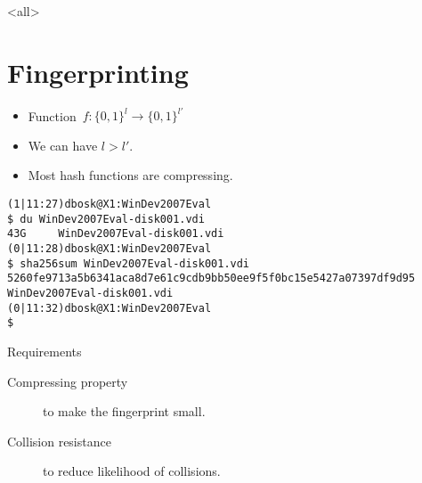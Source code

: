 \mode*

\mode<all>{}


\section{Fingerprinting}

\begin{frame}
  \begin{definition}[Compressing]
    \begin{itemize}
      \item Function~\(f\colon \{0, 1\}^{l}\to \{0, 1\}^{l'}\)
      \item We can have \(l > l'\).
    \end{itemize}
  \end{definition}

  \pause

  \begin{remark}
    \begin{itemize}
      \item Most hash functions are compressing.
    \end{itemize}
  \end{remark}
\end{frame}

\begin{frame}[fragile]
  \begin{example}[Compressing]
    \begin{itemize}
      \begin{verbatim}
(1|11:27)dbosk@X1:WinDev2007Eval
$ du WinDev2007Eval-disk001.vdi
43G     WinDev2007Eval-disk001.vdi
(0|11:28)dbosk@X1:WinDev2007Eval
$ sha256sum WinDev2007Eval-disk001.vdi
5260fe9713a5b6341aca8d7e61c9cdb9bb50ee9f5f0bc15e5427a07397df9d95  WinDev2007Eval-disk001.vdi
(0|11:32)dbosk@X1:WinDev2007Eval
$
      \end{verbatim}
    \end{itemize}
  \end{example}
\end{frame}

\begin{frame}
  \begin{block}{Requirements}
    \begin{description}
      \item[Compressing property] to make the fingerprint small.
      \item[Collision resistance] to reduce likelihood of collisions.
    \end{description}
  \end{block}
\end{frame}

